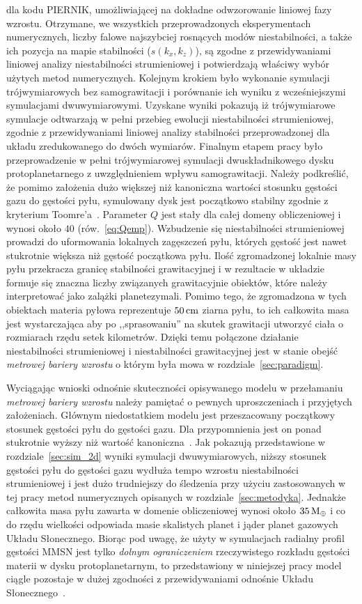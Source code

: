 dla kodu \textsc{PIERNIK}, umożliwiającej na dokładne odwzorowanie liniowej fazy
wzrostu.  Otrzymane, we wszystkich przeprowadzonych eksperymentach numerycznych,
liczby falowe najszybciej rosnących modów niestabilności, a także ich pozycja na
mapie stabilności ($s(k_x, k_z)$), są zgodne z przewidywaniami liniowej analizy
niestabilności strumieniowej i potwierdzają właściwy wybór użytych metod
numerycznych. Kolejnym krokiem było wykonanie symulacji trójwymiarowych bez
samograwitacji i porównanie ich wyniku z wcześniejszymi symulacjami
dwuwymiarowymi. Uzyskane wyniki pokazują iż trójwymiarowe symulacje odtwarzają w
pełni przebieg ewolucji niestabilności strumieniowej, zgodnie z przewidywaniami
liniowej analizy stabilności przeprowadzonej dla układu zredukowanego do dwóch
wymiarów. Finalnym etapem pracy było przeprowadzenie w pełni trójwymiarowej
symulacji dwuskładnikowego dysku protoplanetarnego z uwzględnieniem wpływu
samograwitacji. Należy podkreślić, że pomimo założenia dużo większej niż
kanoniczna wartości stosunku gęstości gazu do gęstości pyłu, symulowany dysk
jest początkowo stabilny zgodnie z kryterium Toomre'a~.
Parameter $Q$ jest stały dla całej domeny obliczeniowej i wynosi około $40$
(rów.~\ref{eq:Qemp}). Wzbudzenie się niestabilności strumieniowej prowadzi do
uformowania lokalnych zagęszczeń pyłu, których gęstość jest nawet stukrotnie
większa niż gęstość początkowa pyłu. Ilość zgromadzonej lokalnie masy pyłu
przekracza granicę stabilności grawitacyjnej i w rezultacie w układzie formuje
się znaczna liczby związanych grawitacyjnie obiektów, które należy interpretować
jako zalążki planetezymali. Pomimo tego, że zgromadzona w tych obiektach materia
pyłowa reprezentuje $50\hbox{$\thinspace\textrm{cm}$}$ ziarna pyłu, to ich całkowita masa jest
wystarczająca aby po ,,sprasowaniu'' na skutek grawitacji utworzyć ciała o
rozmiarach rzędu setek kilometrów. Dzięki temu połączone działanie
niestabilności strumieniowej i niestabilności grawitacyjnej jest w stanie obejść
\emph{metrowej bariery wzrostu} o którym była mowa w
rozdziale~\ref{sec:paradigm}.
%
\par Wyciągając wnioski odnośnie skuteczności opisywanego modelu w przełamaniu
\emph{metrowej bariery wzrostu} należy pamiętać o pewnych uproszczeniach i
przyjętych założeniach. Głównym niedostatkiem modelu jest przeszacowany
początkowy stosunek gęstości pyłu do gęstości gazu. Dla przypomnienia jest on
ponad stukrotnie wyższy niż wartość kanoniczna~\cite{FS03}. Jak pokazują
przedstawione w rozdziale~\ref{sec:sim_2d} wyniki symulacji dwuwymiarowych,
niższy stosunek gęstości pyłu do gęstości gazu wydłuża tempo wzrostu
niestabilności strumieniowej i jest dużo trudniejszy do śledzenia przy użyciu
zastosowanych w tej pracy metod numerycznych opisanych w
rozdziale~\ref{sec:metodyka}. Jednakże całkowita masa pyłu zawarta w domenie
obliczeniowej wynosi około $35\hbox{$\mathrm{\thinspace M_{\oplus}}$}$ i co do rzędu wielkości odpowiada masie
skalistych planet i jąder planet gazowych Układu Słonecznego. Biorąc pod uwagę,
że użyty w symulacjach radialny profil gęstości MMSN jest tylko \emph{dolnym
ograniczeniem} rzeczywistego rozkładu gęstości materii w dysku protoplanetarnym,
to przedstawiony w niniejszej pracy model ciągle pozostaje w dużej zgodności z
przewidywaniami odnośnie Układu Słonecznego~\cite{D07}.


